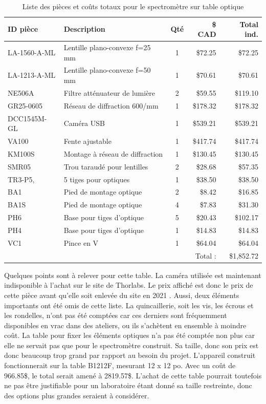 \documentclass[11pt,letterpaper]{article}
\begin{document}
\begin{table}[!ht]
    \centering
    \caption{Liste des pièces et coûts totaux pour le spectromètre sur table optique \cite{noauthor_thorlabs_2024}}
    \begin{tabular}{|l|l|c|r|r|}
    \hline
        ID pièce & Description & Qté & \$ CAD & Total ind. \\ \hline\hline
        LA-1560-A-ML & Lentille plano-convexe f=25 mm & 1 & \$72.25 & \$72.25 \\ \hline
        LA-1213-A-ML & Lentille plano-convexe f=50 mm & 1 & \$70.61 & \$70.61 \\ \hline
        NE506A & Filtre atténuateur de lumière & 2 & \$59.55 & \$119.10 \\ \hline
        GR25-0605 & Réseau de diffraction 600/mm & 1 & \$178.32 & \$178.32 \\ \hline
        DCC1545M-GL & Caméra USB & 1 & \$539.21 & \$539.21 \\ \hline
        VA100 & Fente ajustable & 1 & \$417.74 & \$417.74 \\ \hline
        KM100S & Montage à réseau de diffraction & 1 & \$130.45 & \$130.45 \\ \hline
        SMR05 & Trou taraudé pour lentilles & 2 & \$28.68 & \$57.35 \\ \hline
        TR3-P5, & 5 tiges pour optiques & 1 & \$38.50 & \$38.50 \\ \hline
        BA1 & Pied de montage optique & 2 & \$8.42 & \$16.85 \\ \hline
        BA1S & Pied de montage optique & 4 & \$7.83 & \$31.30 \\ \hline
        PH6 & Base pour tiges d'optique & 5 & \$20.43 & \$102.17 \\ \hline
        PH4 & Base pour tiges d'optique & 1 & \$14.83 & \$14.83 \\ \hline
        VC1 & Pince en V & 1 & \$64.04 & \$64.04 \\ \hline\hline
        ~ & ~ & ~ & Total : & \$1,852.72 \\ \hline
    \end{tabular}
    \label{prix_table}
\end{table}

Quelques points sont à relever pour cette table. La caméra utilisée est maintenant indisponible
à l'achat sur le site de Thorlabs. Le prix affiché est donc le prix de cette pièce avant
qu'elle soit enlevée du site en 2021 \cite{noauthor_thorlabs_2021}. Aussi, deux éléments importants
ont été omis de cette liste. La quincaillerie, soit les vis, les écrous et les 
rondelles, n'ont pas été comptées car ces derniers sont fréquemment disponibles en vrac dans
des ateliers, ou ils s'achètent en ensemble à moindre coût. La table pour fixer les éléments 
optiques n'a pas été comptée non plus car elle ne servait pas que pour le spectromètre 
construit. Sa taille, donc son prix est donc beaucoup trop grand par rapport au besoin du projet. L'appareil
construit fonctionnerait sur la table B1212F, mesurant 12 x 12 po. Avec un coût de 966.85\$,
le total serait amené à 2819.57\$. L'achat de cette table pourrait toutefois ne pas être 
justifiable pour un laboratoire étant donné sa taille restreinte, donc des options plus grandes
seraient à considérer.
\end{document}
